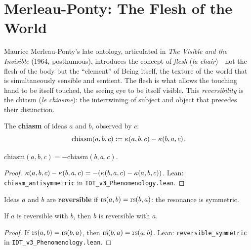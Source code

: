 
\section{Merleau-Ponty: The Flesh of the World}

Maurice Merleau-Ponty's late ontology, articulated in \textit{The Visible and
the Invisible} (1964, posthumous), introduces the concept of \emph{flesh}
(\textit{la chair})---not the flesh of the body but the ``element'' of Being
itself, the texture of the world that is simultaneously sensible and sentient.
The flesh is what allows the touching hand to be itself touched, the seeing
eye to be itself visible. This \emph{reversibility} is the chiasm
(\textit{le chiasme}): the intertwining of subject and object that precedes
their distinction.

\begin{definition}[Chiasm]
\label{def:chiasm}
The \textbf{chiasm} of ideas $a$ and $b$, observed by $c$:
\[
\mathrm{chiasm}(a, b, c) := \kappa(a, b, c) - \kappa(b, a, c).
\]
\end{definition}

\begin{theorem}
\label{thm:chiasm-antisymm}
$\mathrm{chiasm}(a, b, c) = -\mathrm{chiasm}(b, a, c)$.
\end{theorem}

\begin{proof}
$\kappa(a, b, c) - \kappa(b, a, c) = -(\kappa(b, a, c) - \kappa(a, b, c))$.
Lean: \texttt{chiasm\_antisymmetric} in \texttt{IDT\_v3\_Phenomenology.lean}.
\end{proof}

\begin{definition}[Reversibility]
\label{def:reversibility}
Ideas $a$ and $b$ are \textbf{reversible} if $\mathrm{rs}(a, b) = \mathrm{rs}(b, a)$:
the resonance is symmetric.
\end{definition}

\begin{theorem}
\label{thm:reversible-symm}
If $a$ is reversible with $b$, then $b$ is reversible with $a$.
\end{theorem}

\begin{proof}
If $\mathrm{rs}(a, b) = \mathrm{rs}(b, a)$, then $\mathrm{rs}(b, a) = \mathrm{rs}(a, b)$.
Lean: \texttt{reversible\_symmetric} in \texttt{IDT\_v3\_Phenomenology.lean}.
\end{proof}

